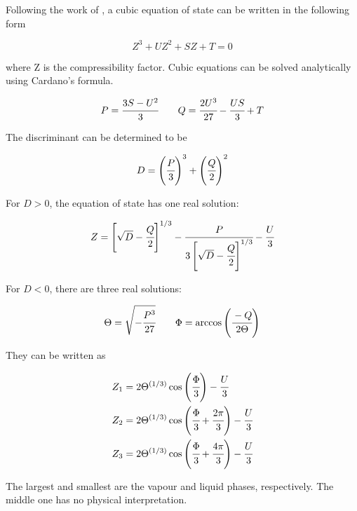 \documentclass[../Article_Model_Parameters.tex]{subfiles}
\begin{document}
	
	Following the work of \citet{Gmehling2019}, a cubic equation of state can be written in the following form
	
	{\footnotesize
		\begin{equation}
			Z^3 + UZ^2+ SZ + T = 0
		\end{equation}
	}

	where Z is the compressibility factor. Cubic equations can be solved analytically using Cardano's formula.
	
	{\footnotesize
		\begin{equation*}
			P = \cfrac{3S-U^2}{3} \qquad Q = \cfrac{2U^3}{27}-\cfrac{US}{3} + T
		\end{equation*}
	}

	The discriminant can be determined to be
	
	{\footnotesize
		\begin{equation}
			D = \left( \cfrac{P}{3} \right)^3 + \left( \cfrac{Q}{2} \right)^2
		\end{equation}
	}

	For $D>0$, the equation of state has one real solution:
	
	{\footnotesize
		\begin{equation}
			Z = \left[ \sqrt{D} - \cfrac{Q}{2} \right]^{1/3} - \cfrac{P}{ 3 \left[ \sqrt{D}-\cfrac{Q}{2} \right]^{1/3} } - \cfrac{U}{3}
		\end{equation}
	}

	For $D<0$, there are three real solutions:
	
	{\footnotesize
		\begin{equation*}
			\Theta = \sqrt{-\cfrac{P^3}{27}} \qquad \Phi = \arccos\left( \cfrac{-Q}{2\Theta} \right)
		\end{equation*}
	}

	They can be written as
	
	{\footnotesize
		\begin{align}
			Z_1 &= 2\Theta^{(1/3)} \cos \left( \cfrac{\Phi}{3} \right) - \cfrac{U}{3} \\
			Z_2 &= 2\Theta^{(1/3)} \cos \left( \cfrac{\Phi}{3} + \cfrac{2\pi}{3} \right) - \cfrac{U}{3} \\
			Z_3 &= 2\Theta^{(1/3)} \cos \left( \cfrac{\Phi}{3} + \cfrac{4\pi}{3} \right) - \cfrac{U}{3} 
		\end{align}
	}
	
	The largest and smallest are the vapour and liquid phases, respectively. The middle one has no physical interpretation.
	
\end{document}
